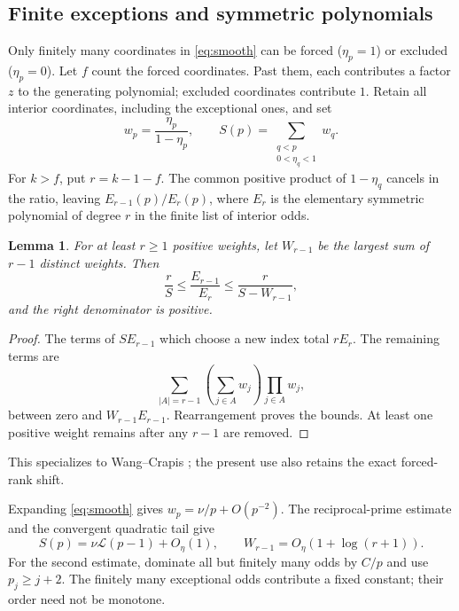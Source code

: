 \documentclass[11pt]{article}
\newtheorem{lemma}[theorem]{Lemma}
\theoremstyle{definition}
\newcommand{\LL}{\mathcal L}
\begin{document}
\subsection{Finite exceptions and symmetric polynomials}
Only finitely many coordinates in \eqref{eq:smooth} can be forced
($\eta_p=1$) or excluded ($\eta_p=0$). Let $f$ count the forced
coordinates. Past them, each contributes a factor $z$ to the
generating polynomial; excluded coordinates contribute $1$.
Retain all interior coordinates, including the exceptional ones,
and set
\[
 w_p=\frac{\eta_p}{1-\eta_p},\qquad
 S(p)=\sum_{\substack{q<p\\0<\eta_q<1}}w_q.
\]
For $k>f$, put $r=k-1-f$. The common positive product of
$1-\eta_q$ cancels in the ratio, leaving $E_{r-1}(p)/E_r(p)$,
where $E_r$ is the elementary symmetric polynomial of degree $r$
in the finite list of interior odds.

\begin{lemma}\label{lem:symmetric}
For at least $r\ge1$ positive weights, let $W_{r-1}$ be the largest
sum of $r-1$ distinct weights. Then
\begin{equation}\label{eq:ratio}
 \frac rS\le\frac{E_{r-1}}{E_r}\le\frac r{S-W_{r-1}},
\end{equation}
and the right denominator is positive.
\end{lemma}
\begin{proof}
The terms of $SE_{r-1}$ which choose a new index total $rE_r$.
The remaining terms are
\[
 \sum_{|A|=r-1}\left(\sum_{j\in A}w_j\right)\prod_{j\in A}w_j,
\]
between zero and $W_{r-1}E_{r-1}$. Rearrangement proves the bounds.
At least one positive weight remains after any $r-1$ are removed.
\end{proof}
This specializes to Wang--Crapis \cite[Lemmas~3.1--3.2]{WC};
the present use also retains the exact forced-rank shift.

Expanding \eqref{eq:smooth} gives $w_p=\nu/p+O(p^{-2})$.
The reciprocal-prime estimate and the convergent quadratic tail give
\begin{equation}\label{eq:mertens}
 S(p)=\nu\LL(p-1)+O_\eta(1),\qquad
 W_{r-1}=O_\eta(1+\log(r+1)).
\end{equation}
For the second estimate, dominate all but finitely many odds by
$C/p$ and use $p_j\ge j+2$. The finitely many exceptional odds
contribute a fixed constant; their order need not be monotone.
\end{document}
